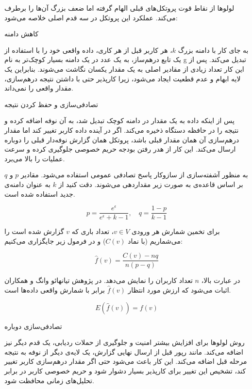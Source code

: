 لولوها از نقاط قوت پروتکل‌های قبلی الهام گرفته اما ضعف بزرگ آن‌ها را برطرف می‌کند. عملکرد این پروتکل در سه قدم اصلی خلاصه می‌شود:


 کاهش دامنه

به جای کار با دامنه بزرگ $k$، هر کاربر قبل از هر کاری، داده واقعی خود را با استفاده از یک تابع درهم‌ساز، به یک عدد در یک دامنه بسیار کوچک‌تر به نام g تبدیل می‌کند. پس از این کار تعداد زیادی از مقادیر اصلی به یک مقدار یکسان نگاشت می‌شوند. بنابراین یک لایه ابهام و عدم قطعیت ایجاد می‌شود، زیرا کارپذیر حتی با داشتن نتیجه درهم‌سازی، مقدار واقعی را نمی‌داند.

 تصادفی‌سازی و حفظ کردن نتیجه

پس از اینکه داده به یک مقدار در دامنه کوچک تبدیل شد، به آن نوفه اضافه کرده و نتیجه را در حافظه دستگاه ذخیره می‌کند. اگر در آینده داده کاربر تغییر کند اما مقدار درهم‌سازی آن همان مقدار قبلی باشد، پروتکل همان گزارش نوفه‌دار قبلی را دوباره ارسال می‌کند. این کار از هدر رفتن بودجه حریم خصوصی جلوگیری کرده و سرعت عملیات را بالا می‌برد.

به منظور آشفته‌سازی از سازوکار پاسخ تصادفی عمومی استفاده می‌شود. مقادیر $p$ و $q$ بر اساس قاعده‌ی  به صورت زیر مقداردهی می‌شوند. دقت کنید از $k$ به عنوان دامنه‌ی جدید استفاده شده است.

$$p = \frac{e^\epsilon}{e^\epsilon + k - 1}, \quad q = \frac{1-p}{k-1}$$

برای تخمین شمارش هر ورودی $v \in V$، تعداد باری که $v$ گزارش شده است را می‌شماریم (با نماد $C(v)$) و در فرمول زیر جایگزاری می‌کنیم:

\begin{equation}
\hat{f}(v) = \frac{C(v) - nq}{n(p - q)}
\end{equation}

در عبارت بالا، $n$ تعداد کاربران را نمایش می‌دهد. در پژوهش تیانهائو وانگ و همکاران  اثبات می‌شود که ارزش مورد انتظار $\hat{f}(v)$ برابر با شمارش واقعی داده‌ها است.

$$E(\hat{f}(v)) = f(v)$$

 تصادفی‌سازی دوباره

روش لولوها برای افزایش بیشتر امنیت و جلوگیری از حملات ردیابی، یک قدم دیگر نیز اضافه می‌کند. مانند رپور قبل از ارسال نهایی گزارش، یک لایه‌ی دیگر از نوفه به نتیجه مرحله قبل اضافه می‌کند. این کار باعث می‌شود حتی اگر مقدار درهم‌سازی کاربر تغییر کند، تشخیص این تغییر برای کارپذیر بسیار دشوار شود و حریم خصوصی کاربر در برابر تحلیل‌های زمانی محافظت شود.

